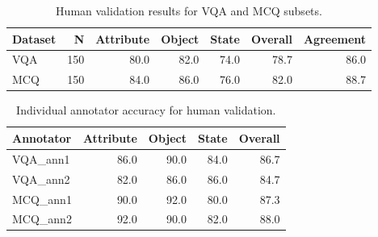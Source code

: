 \begin{table}[t]
\centering
\caption{Human validation results for VQA and MCQ subsets.}
\label{tab:human_validation}
\begin{tabular}{lrrrrrr}
\toprule
Dataset & N & Attribute & Object & State & Overall & Agreement \\
\midrule
VQA & 150 & 80.0 & 82.0 & 74.0 & 78.7 & 86.0 \\
MCQ & 150 & 84.0 & 86.0 & 76.0 & 82.0 & 88.7 \\
\bottomrule
\end{tabular}
\end{table}

\begin{table}[t]
\centering
\caption{Individual annotator accuracy for human validation.}
\label{tab:human_validation_annotators}
\begin{tabular}{lrrrr}
\toprule
Annotator & Attribute & Object & State & Overall \\
\midrule
VQA_ann1 & 86.0 & 90.0 & 84.0 & 86.7 \\
VQA_ann2 & 82.0 & 86.0 & 86.0 & 84.7 \\
MCQ_ann1 & 90.0 & 92.0 & 80.0 & 87.3 \\
MCQ_ann2 & 92.0 & 90.0 & 82.0 & 88.0 \\
\bottomrule
\end{tabular}
\end{table}
